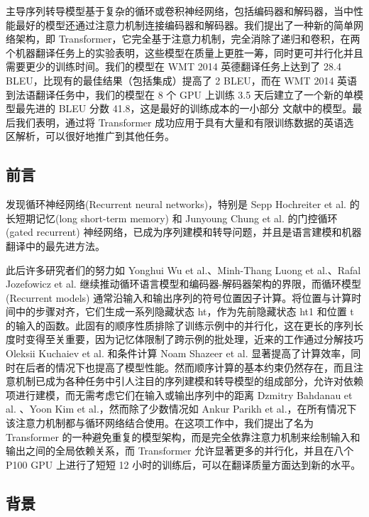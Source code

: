 主导序列转导模型基于复杂的循环或卷积神经网络，包括编码器和解码器，当中性能最好的模型还通过注意力机制连接编码器和解码器。我们提出了一种新的简单网络架构，即 Transformer，它完全基于注意力机制，完全消除了递归和卷积，在两个机器翻译任务上的实验表明，这些模型在质量上更胜一筹，同时更可并行化并且需要更少的训练时间。我们的模型在 WMT 2014 英德翻译任务上达到了 28.4 BLEU，比现有的最佳结果（包括集成）提高了 2 BLEU，而在 WMT 2014 英语到法语翻译任务中，我们的模型在 8 个 GPU 上训练 3.5 天后建立了一个新的单模型最先进的 BLEU 分数 41.8，这是最好的训练成本的一小部分 文献中的模型。最后我们表明，通过将 Transformer 成功应用于具有大量和有限训练数据的英语选区解析，可以很好地推广到其他任务。

\subsection{前言}

发现循环神经网络(Recurrent neural networks)，特别是 Sepp Hochreiter et al. 的长短期记忆(long short-term memory) 和 Junyoung Chung et al. 的门控循环 (gated recurrent) 神经网络，已成为序列建模和转导问题，并且是语言建模和机器翻译中的最先进方法。

此后许多研究者们的努力如 Yonghui Wu et al.、Minh-Thang Luong et al.、Rafal Jozefowicz et al. 继续推动循环语言模型和编码器-解码器架构的界限，而循环模型 (Recurrent models) 通常沿输入和输出序列的符号位置因子计算。将位置与计算时间中的步骤对齐，它们生成一系列隐藏状态 ht，作为先前隐藏状态 ht1 和位置 t 的输入的函数。此固有的顺序性质排除了训练示例中的并行化，这在更长的序列长度时变得至关重要，因为记忆体限制了跨示例的批处理，近来的工作通过分解技巧 Oleksii Kuchaiev et al. 和条件计算 Noam Shazeer et al. 显著提高了计算效率，同时在后者的情况下也提高了模型性能。然而顺序计算的基本约束仍然存在，而且注意机制已成为各种任务中引人注目的序列建模和转导模型的组成部分，允许对依赖项进行建模，而无需考虑它们在输入或输出序列中的距离 Dzmitry Bahdanau et al. 、Yoon Kim et al.，然而除了少数情况如 Ankur Parikh et al.，在所有情况下该注意力机制都与循环网络结合使用。在这项工作中，我们提出了名为 Transformer 的一种避免重复的模型架构，而是完全依靠注意力机制来绘制输入和输出之间的全局依赖关系，而 Transformer 允许显著更多的并行化，并且在八个 P100 GPU 上进行了短短 12 小时的训练后，可以在翻译质量方面达到新的水平。

\subsection{背景}

